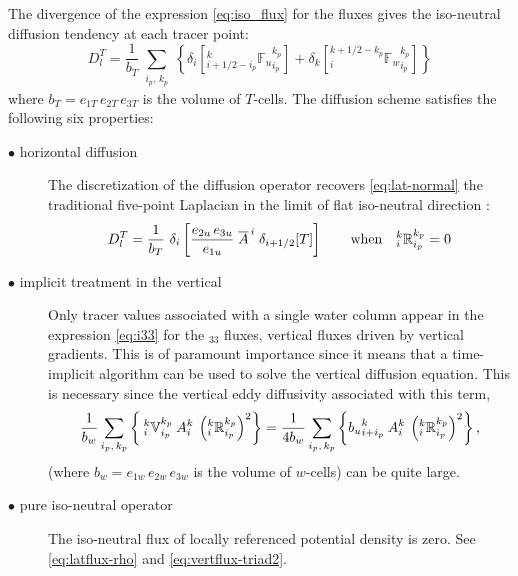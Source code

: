 \documentclass[../tex_main/NEMO_manual]{subfiles}
\begin{document}
 The divergence of the expression \autoref{eq:iso_flux} for the fluxes gives the iso-neutral diffusion tendency at
each tracer point:
\begin{equation} \label{eq:iso_operator} D_l^T = \frac{1}{b_T}
  \sum_{\substack{i_p,\,k_p}} \left\{ \delta_{i} \left[{_{i+1/2-i_p}^k
        {\mathbb{F}_u }_{i_p}^{k_p}} \right] + \delta_{k} \left[
      {_i^{k+1/2-k_p} {\mathbb{F}_w}_{i_p}^{k_p}} \right] \right\}
\end{equation}
where $b_T= e_{1T}\,e_{2T}\,e_{3T}$ is the volume of $T$-cells.
The diffusion scheme satisfies the following six properties:
\begin{description}
\item[$\bullet$ horizontal diffusion] The discretization of the
  diffusion operator recovers \autoref{eq:lat-normal} the traditional five-point Laplacian in
  the limit of flat iso-neutral direction :
  \begin{equation} \label{eq:iso_property0} D_l^T = \frac{1}{b_T} \
    \delta_{i} \left[ \frac{e_{2u}\,e_{3u}}{e_{1u}} \;
      \overline{{A}}^{\,i} \; \delta_{i+1/2}[T] \right] \qquad
    \text{when} \quad { _i^k \mathbb{R}_{i_p}^{k_p} }=0
  \end{equation}

\item[$\bullet$ implicit treatment in the vertical] Only tracer values
  associated with a single water column appear in the expression
  \autoref{eq:i33} for the $_{33}$ fluxes, vertical fluxes driven by
  vertical gradients. This is of paramount importance since it means
  that a time-implicit algorithm can be used to solve the vertical
  diffusion equation. This is necessary
 since the vertical eddy
  diffusivity associated with this term,
  \begin{equation}
    \frac{1}{b_w}\sum_{\substack{i_p, \,k_p}} \left\{
      {\:}_i^k\mathbb{V}_{i_p}^{k_p} \: {A}_i^k \: \left(_i^k \mathbb{R}_{i_p}^{k_p}\right)^2
    \right\}  =
    \frac{1}{4b_w}\sum_{\substack{i_p, \,k_p}} \left\{
      {b_u}_{i+i_p}^k\: {A}_i^k \: \left(_i^k \mathbb{R}_{i_p}^{k_p}\right)^2
    \right\},
 \end{equation}
  (where $b_w= e_{1w}\,e_{2w}\,e_{3w}$ is the volume of $w$-cells) can be quite large.

\item[$\bullet$ pure iso-neutral operator] The iso-neutral flux of
  locally referenced potential density is zero. See
  \autoref{eq:latflux-rho} and \autoref{eq:vertflux-triad2}.


\end{description}
\end{document}
